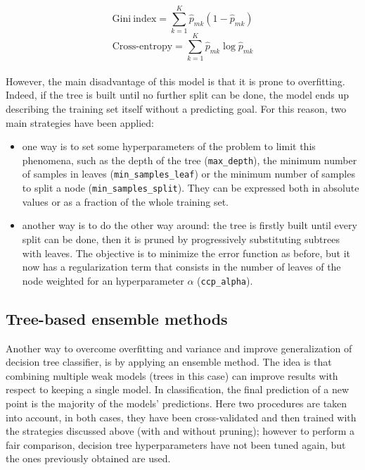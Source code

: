 \documentclass[letterpaper]{article}
\begin{document}
	\begin{equation} \label{gini}
		\mathrm{Gini\ index}=\sum_{k=1}^{K}\hat{p}_{mk}(1-\hat{p}_{mk})
	\end{equation}
	\begin{equation} \label{entropy}
		\mathrm{Cross\mbox{-}entropy}=\sum_{k=1}^{K}\hat{p}_{mk}\log\hat{p}_{mk}
	\end{equation}\\
	However, the main disadvantage of this model is that it is prone to overfitting. Indeed, if the tree is built until no further split can be done, the model ends up describing the training set itself without a predicting goal. For this reason, two main strategies have been applied:
	\begin{itemize}
		\item one way is to set some hyperparameters of the problem to limit this phenomena, such as the depth of the tree (\texttt{max\_depth}), the minimum number of samples in leaves (\texttt{min\_samples\_leaf}) or the minimum number of samples to split a node (\texttt{min\_samples\_split}). They can be expressed both in absolute values or as a fraction of the whole training set.
		\item another way is to do the other way around: the tree is firstly built until every split can be done, then it is pruned by progressively substituting subtrees with leaves. The objective is to minimize the error function as before, but it now has a regularization term that consists in the number of leaves of the node weighted for an hyperparameter $\alpha$ (\texttt{ccp\_alpha}).
	\end{itemize}
	
	\subsection{Tree-based ensemble methods}
	Another way to overcome overfitting and variance and improve generalization of decision tree classifier, is by applying an ensemble method. The idea is that combining multiple weak models (trees in this case) can improve results with respect to keeping a single model. In classification, the final prediction of a new point is the majority of the models' predictions. Here two procedures are taken into account, in both cases, they have been cross-validated and then trained with the strategies discussed above (with and without pruning); however to perform a fair comparison, decision tree hyperparameters have not been tuned again, but the ones previously obtained are used.
\end{document}
